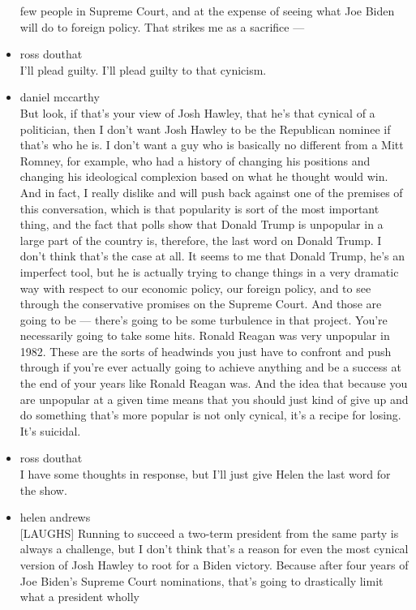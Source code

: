 \begin{itemize}
  few people in Supreme Court, and at the expense of seeing what Joe
  Biden will do to foreign policy. That strikes me as a sacrifice ---
\item
  ross douthat\\
  I'll plead guilty. I'll plead guilty to that cynicism.
\item
  daniel mccarthy\\
  But look, if that's your view of Josh Hawley, that he's that cynical
  of a politician, then I don't want Josh Hawley to be the Republican
  nominee if that's who he is. I don't want a guy who is basically no
  different from a Mitt Romney, for example, who had a history of
  changing his positions and changing his ideological complexion based
  on what he thought would win. And in fact, I really dislike and will
  push back against one of the premises of this conversation, which is
  that popularity is sort of the most important thing, and the fact that
  polls show that Donald Trump is unpopular in a large part of the
  country is, therefore, the last word on Donald Trump. I don't think
  that's the case at all. It seems to me that Donald Trump, he's an
  imperfect tool, but he is actually trying to change things in a very
  dramatic way with respect to our economic policy, our foreign policy,
  and to see through the conservative promises on the Supreme Court. And
  those are going to be --- there's going to be some turbulence in that
  project. You're necessarily going to take some hits. Ronald Reagan was
  very unpopular in 1982. These are the sorts of headwinds you just have
  to confront and push through if you're ever actually going to achieve
  anything and be a success at the end of your years like Ronald Reagan
  was. And the idea that because you are unpopular at a given time means
  that you should just kind of give up and do something that's more
  popular is not only cynical, it's a recipe for losing. It's suicidal.
\item
  ross douthat\\
  I have some thoughts in response, but I'll just give Helen the last
  word for the show.
\item
  helen andrews\\
  {[}LAUGHS{]} Running to succeed a two-term president from the same
  party is always a challenge, but I don't think that's a reason for
  even the most cynical version of Josh Hawley to root for a Biden
  victory. Because after four years of Joe Biden's Supreme Court
  nominations, that's going to drastically limit what a president wholly

\end{itemize}
